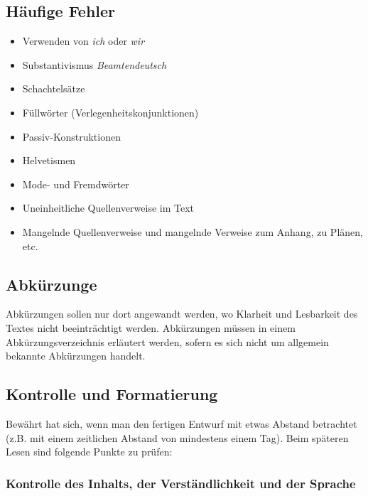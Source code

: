 \documentclass[
  letterpaper,
  DIV=11]{scrartcl}
\providecommand{\tightlist}{%
  \setlength{\itemsep}{0pt}\setlength{\parskip}{0pt}}\usepackage{longtable,booktabs,array}
\begin{document}
\subsection{Häufige Fehler}\label{huxe4ufige-fehler}

\begin{itemize}
\tightlist
\item
  Verwenden von \emph{ich} oder \emph{wir}
\item
  Substantivismus \emph{Beamtendeutsch}
\item
  Schachtelsätze
\item
  Füllwörter (Verlegenheitskonjunktionen)
\item
  Passiv-Konstruktionen
\item
  Helvetismen
\item
  Mode- und Fremdwörter
\item
  Uneinheitliche Quellenverweise im Text
\item
  Mangelnde Quellenverweise und mangelnde Verweise zum Anhang, zu
  Plänen, etc.
\end{itemize}

\subsection{Abkürzunge}\label{abkuxfcrzunge}

Abkürzungen sollen nur dort angewandt werden, wo Klarheit und Lesbarkeit
des Textes nicht beeinträchtigt werden. Abkürzungen müssen in einem
Abkürzungsverzeichnis erläutert werden, sofern es sich nicht um
allgemein bekannte Abkürzungen handelt.

\subsection{Kontrolle und
Formatierung}\label{kontrolle-und-formatierung}

Bewährt hat sich, wenn man den fertigen Entwurf mit etwas Abstand
betrachtet (z.B. mit einem zeitlichen Abstand von mindestens einem Tag).
Beim späteren Lesen sind folgende Punkte zu prüfen:

\subsubsection{Kontrolle des Inhalts, der Verständlichkeit und der
Sprache}\label{kontrolle-des-inhalts-der-verstuxe4ndlichkeit-und-der-sprache}
\end{document}
